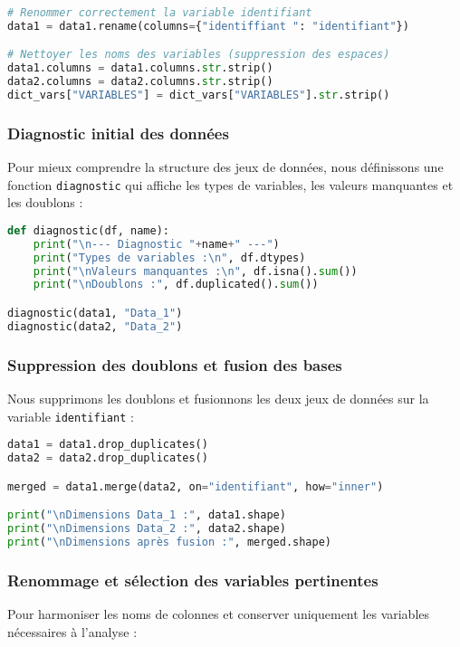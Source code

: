\begin{lstlisting}[language=Python, caption=Renommage et nettoyage des colonnes]
# Renommer correctement la variable identifiant
data1 = data1.rename(columns={"identiffiant ": "identifiant"})

# Nettoyer les noms des variables (suppression des espaces)
data1.columns = data1.columns.str.strip()
data2.columns = data2.columns.str.strip()
dict_vars["VARIABLES"] = dict_vars["VARIABLES"].str.strip()
\end{lstlisting}
\subsubsection{Diagnostic initial des données}
Pour mieux comprendre la structure des jeux de données, nous définissons une fonction \texttt{diagnostic} qui affiche les types de variables, les valeurs manquantes et les doublons :

\begin{lstlisting}[language=Python, caption=Diagnostic des bases]
def diagnostic(df, name):
    print("\n--- Diagnostic "+name+" ---")
    print("Types de variables :\n", df.dtypes)
    print("\nValeurs manquantes :\n", df.isna().sum())
    print("\nDoublons :", df.duplicated().sum())

diagnostic(data1, "Data_1")
diagnostic(data2, "Data_2")
\end{lstlisting}

\subsubsection{Suppression des doublons et fusion des bases}
Nous supprimons les doublons et fusionnons les deux jeux de données sur la variable \texttt{identifiant} :

\begin{lstlisting}[language=Python, caption=Nettoyage et fusion des données]
data1 = data1.drop_duplicates()
data2 = data2.drop_duplicates()

merged = data1.merge(data2, on="identifiant", how="inner")

print("\nDimensions Data_1 :", data1.shape)
print("\nDimensions Data_2 :", data2.shape)
print("\nDimensions après fusion :", merged.shape)
\end{lstlisting}

\subsubsection{Renommage et sélection des variables pertinentes}
Pour harmoniser les noms de colonnes et conserver uniquement les variables nécessaires à l'analyse :


